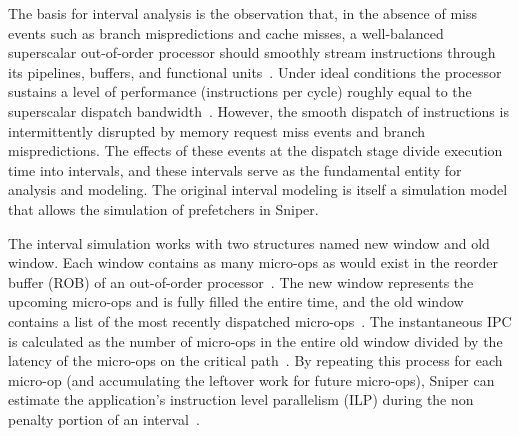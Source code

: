 \documentclass[AMA,final,STIX1COL]{WileyNJD-v2}
\newcommand{\vsg}[1]{\textcolor{blue}{\bfseries \ul{vsgirelli: #1} }\vspace{0.2cm}}
\newcommand{\fbm}[1]{\textcolor{red}{\bfseries \ul{fbm: #1} }\vspace{0.2cm}}
\begin{document}
The basis for interval analysis is the observation that, in the absence of miss events such as branch mispredictions and cache misses, a well-balanced superscalar out-of-order processor should smoothly stream instructions through its pipelines, buffers, and functional units~\cite{eyerman2009model}. 
Under ideal conditions the processor sustains a level of performance (instructions per cycle) roughly equal to the superscalar dispatch bandwidth~\cite{eyerman2009model}. %
However, the smooth dispatch of instructions is intermittently disrupted by memory request miss events and branch mispredictions. %
The effects of these events at the dispatch stage divide execution time into intervals, and these intervals serve as the fundamental entity for analysis and modeling\cite{eyerman2009model}.
The original interval modeling is itself a simulation model that allows the simulation of prefetchers in Sniper.

The interval simulation works with two structures named new window and old window.
Each window contains as many micro-ops as would exist in the reorder buffer (ROB) of an out-of-order processor~\cite{carlson2014aeohmcm}.
The new window represents the upcoming micro-ops and is fully filled the entire time, and the old window contains a list of the most recently dispatched micro-ops~\cite{carlson2014aeohmcm}.
The instantaneous IPC is calculated as the number of micro-ops in the entire old window divided by the latency of the micro-ops on the critical path~\cite{carlson2014aeohmcm}.
By repeating this process for each micro-op (and accumulating the leftover work for future micro-ops), Sniper can estimate the application’s instruction level parallelism (ILP) during the non penalty portion of an interval~\cite{carlson2014aeohmcm}.
\end{document}
